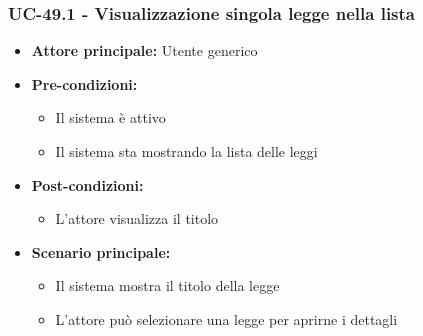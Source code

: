 \documentclass[a4paper,12pt]{article}
\begin{document}
\subsubsection{UC-49.1 - Visualizzazione singola legge nella lista} \label{subsec:UC-49.1}
\begin{itemize}
    \item \textbf{Attore principale:} Utente generico
    \item \textbf{Pre-condizioni:} 
    \begin{itemize}
        \item Il sistema è attivo
        \item Il sistema sta mostrando la lista delle leggi
    \end{itemize}
    \item \textbf{Post-condizioni:}
    \begin{itemize}
        \item L'attore visualizza il titolo
    \end{itemize}
    \item \textbf{Scenario principale:} 
    \begin{itemize}
        \item Il sistema mostra il titolo della legge
        \item L'attore può selezionare una legge per aprirne i dettagli
    \end{itemize}
\end{itemize}
\end{document}
